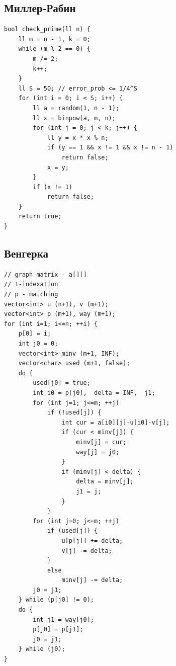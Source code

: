 \documentclass[10pt, portrait,letterpaper]{article}
\begin{document}
\subsection{Миллер-Рабин}
\begin{verbatim}
bool check_prime(ll n) {
    ll m = n - 1, k = 0;
    while (m % 2 == 0) {
        m /= 2;
        k++;
    }
    ll S = 50; // error_prob <= 1/4^S
    for (int i = 0; i < S; i++) {
        ll a = random(1, n - 1);
        ll x = binpow(a, m, n);
        for (int j = 0; j < k; j++) {
            ll y = x * x % n;
            if (y == 1 && x != 1 && x != n - 1)
                return false;
            x = y;
        }
        if (x != 1)
            return false;
    }
    return true;
}
\end{verbatim}

\subsection{Венгерка}

\begin{verbatim}
// graph matrix - a[][]
// 1-indexation
// p - matching
vector<int> u (n+1), v (m+1);
vector<int> p (m+1), way (m+1);
for (int i=1; i<=n; ++i) {
    p[0] = i;
    int j0 = 0;
    vector<int> minv (m+1, INF);
    vector<char> used (m+1, false);
    do {
        used[j0] = true;
        int i0 = p[j0],  delta = INF,  j1;
        for (int j=1; j<=m; ++j)
            if (!used[j]) {
                int cur = a[i0][j]-u[i0]-v[j];
                if (cur < minv[j]) {
                    minv[j] = cur;
                    way[j] = j0;
                }
                if (minv[j] < delta) {
                    delta = minv[j];
                    j1 = j;
                }
            }
        for (int j=0; j<=m; ++j)
            if (used[j]) {
                u[p[j]] += delta;
                v[j] -= delta;
            }
            else
                minv[j] -= delta;
        j0 = j1;
    } while (p[j0] != 0);
    do {
        int j1 = way[j0];
        p[j0] = p[j1];
        j0 = j1;
    } while (j0);
}
\end{verbatim}
\end{document}
